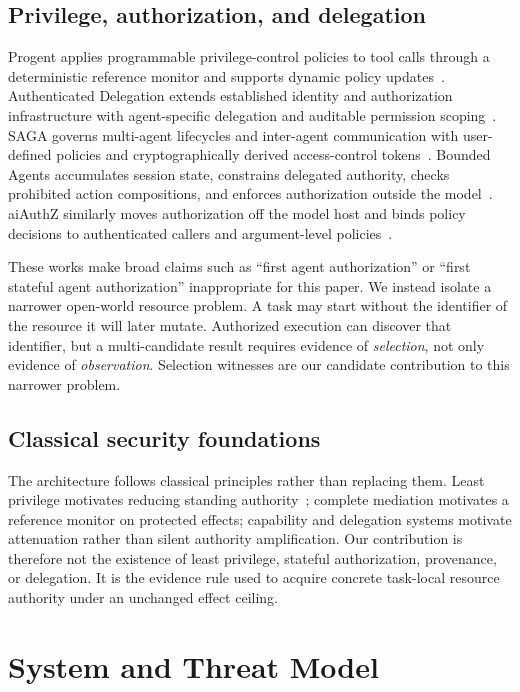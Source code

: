 \documentclass[5p,times,twocolumn]{elsarticle}
\begin{document}
\subsection{Privilege, authorization, and delegation}

Progent applies programmable privilege-control policies to tool calls through a deterministic reference monitor and supports dynamic policy updates~\cite{shi2025progent}. Authenticated Delegation extends established identity and authorization infrastructure with agent-specific delegation and auditable permission scoping~\cite{south2025delegation}. SAGA governs multi-agent lifecycles and inter-agent communication with user-defined policies and cryptographically derived access-control tokens~\cite{syros2026saga}. Bounded Agents accumulates session state, constrains delegated authority, checks prohibited action compositions, and enforces authorization outside the model~\cite{muruaga2026bounded}. aiAuthZ similarly moves authorization off the model host and binds policy decisions to authenticated callers and argument-level policies~\cite{kodathala2026aiauthz}.

These works make broad claims such as ``first agent authorization'' or ``first stateful agent authorization'' inappropriate for this paper. We instead isolate a narrower open-world resource problem. A task may start without the identifier of the resource it will later mutate. Authorized execution can discover that identifier, but a multi-candidate result requires evidence of \emph{selection}, not only evidence of \emph{observation}. Selection witnesses are our candidate contribution to this narrower problem.

\subsection{Classical security foundations}

The architecture follows classical principles rather than replacing them. Least privilege motivates reducing standing authority~\cite{saltzer1975protection}; complete mediation motivates a reference monitor on protected effects; capability and delegation systems motivate attenuation rather than silent authority amplification. Our contribution is therefore not the existence of least privilege, stateful authorization, provenance, or delegation. It is the evidence rule used to acquire concrete task-local resource authority under an unchanged effect ceiling.

\section{System and Threat Model}
\label{sec:threat}
\end{document}
